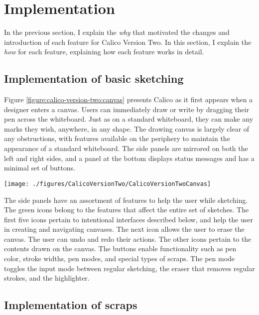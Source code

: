 \section{Implementation}
\label{chapter:calico-version-two:implementation}
    
In the previous section, I explain the \emph{why} that motivated the changes and introduction of each feature for Calico Version Two. In this section, I explain the \emph{how} for each feature, explaining how each feature works in detail.

\subsection{Implementation of basic sketching}

Figure \ref{figure:calico-version-two:canvas} presents Calico as it first appears when a designer enters a canvas. Users can immediately draw or write by dragging their pen across the whiteboard. Just as on a standard whiteboard, they can make any marks they wish, anywhere, in any shape. The drawing canvas is largely clear of any obstructions, with features available on the periphery to maintain the appearance of a standard whiteboard. The side panels are mirrored on both the left and right sides, and a panel at the bottom displays status messages and has a minimal set of buttons. 

\begin{figure*}[tbh]
  \centering
  \texttt{[image: ./figures/CalicoVersionTwo/CalicoVersionTwoCanvas]}
  \caption{The Calico canvas interface, including the side panels and the drawing space.}
  \label{figure:calico-version-two:canvas}
\end{figure*}

The side panels have an assortment of features to help the user while sketching. The green icons belong to the features that affect the entire set of sketches. The first five icons pertain to intentional interfaces described below, and help the user in creating and navigating canvases. The next icon allows the user to erase the canvas. The user can undo and redo their actions. The other icons pertain to the contents drawn on the canvas. The buttons enable functionality such as pen color, stroke widths, pen modes, and special types of scraps. The pen mode toggles the input mode between regular sketching, the eraser that removes regular strokes, and the highlighter.  

\subsection{Implementation of scraps}

